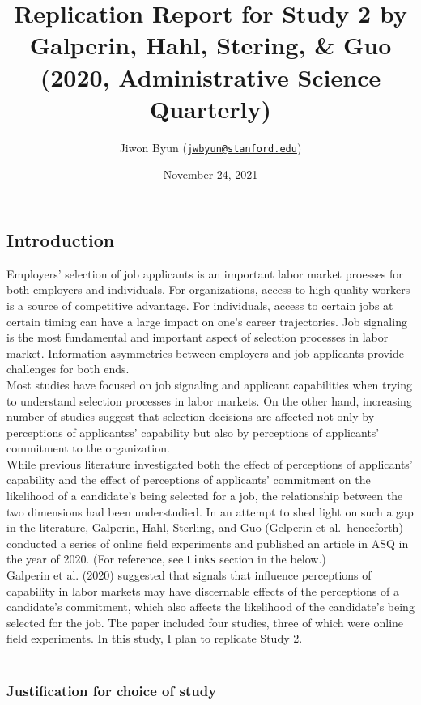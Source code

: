 \documentclass[]{article}
\title{Replication Report for Study 2 by Galperin, Hahl, Stering, \& Guo (2020,
Administrative Science Quarterly)}
\author{Jiwon Byun
(\href{mailto:jwbyun@stanford.edu}{\nolinkurl{jwbyun@stanford.edu}})}
\date{November 24, 2021}
\begin{document}
\maketitle

{
\setcounter{tocdepth}{3}
\tableofcontents
}
\hypertarget{introduction}{%
\subsection{Introduction}\label{introduction}}

Employers' selection of job applicants is an important labor market
proesses for both employers and individuals. For organizations, access
to high-quality workers is a source of competitive advantage. For
individuals, access to certain jobs at certain timing can have a large
impact on one's career trajectories. Job signaling is the most
fundamental and important aspect of selection processes in labor market.
Information asymmetries between employers and job applicants provide
challenges for both ends.\\
Most studies have focused on job signaling and applicant capabilities
when trying to understand selection processes in labor markets. On the
other hand, increasing number of studies suggest that selection
decisions are affected not only by perceptions of applicantss'
capability but also by perceptions of applicants' commitment to the
organization.\\
While previous literature investigated both the effect of perceptions of
applicants' capability and the effect of perceptions of applicants'
commitment on the likelihood of a candidate's being selected for a job,
the relationship between the two dimensions had been understudied. In an
attempt to shed light on such a gap in the literature, Galperin, Hahl,
Sterling, and Guo (Gelperin et al.~henceforth) conducted a series of
online field experiments and published an article in ASQ in the year of
2020. (For reference, see \texttt{Links} section in the below.)\\
Galperin et al. (2020) suggested that signals that influence perceptions
of capability in labor markets may have discernable effects of the
perceptions of a candidate's commitment, which also affects the
likelihood of the candidate's being selected for the job. The paper
included four studies, three of which were online field experiments. In
this study, I plan to replicate Study 2.\\
~\\

\hypertarget{justification-for-choice-of-study}{%
\subsubsection{Justification for choice of
study}\label{justification-for-choice-of-study}}
\end{document}
